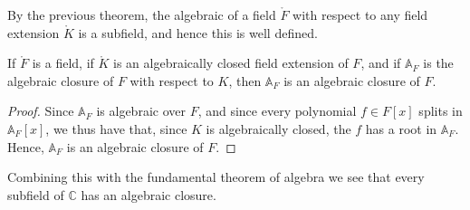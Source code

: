 \documentclass{article}                                                        %
\begin{document}
        By the previous theorem, the algebraic of a field $\ring{F}$ with
        respect to any field extension $\ring{K}$ is a subfield, and hence this
        is well defined.
        \begin{theorem}
            If $\ring{F}$ is a field, if $\ring{K}$ is an algebraically closed
            field extension of $F$, and if $\mathbb{A}_{F}$ is the algebraic
            closure of $F$ with respect to $K$, then $\mathbb{A}_{F}$ is an
            algebraic closure of $F$.
        \end{theorem}
        \begin{proof}
            Since $\mathbb{A}_{F}$ is algebraic over $F$, and since every
            polynomial $f\in{F}[x]$ splits in $\mathbb{A}_{F}[x]$, we thus have
            that, since $K$ is algebraically closed, the $f$ has a root in
            $\mathbb{A}_{F}$. Hence, $\mathbb{A}_{F}$ is an algebraic closure
            of $F$.
        \end{proof}
        Combining this with the fundamental theorem of algebra we see that
        every subfield of $\mathbb{C}$ has an algebraic closure.
\end{document}
